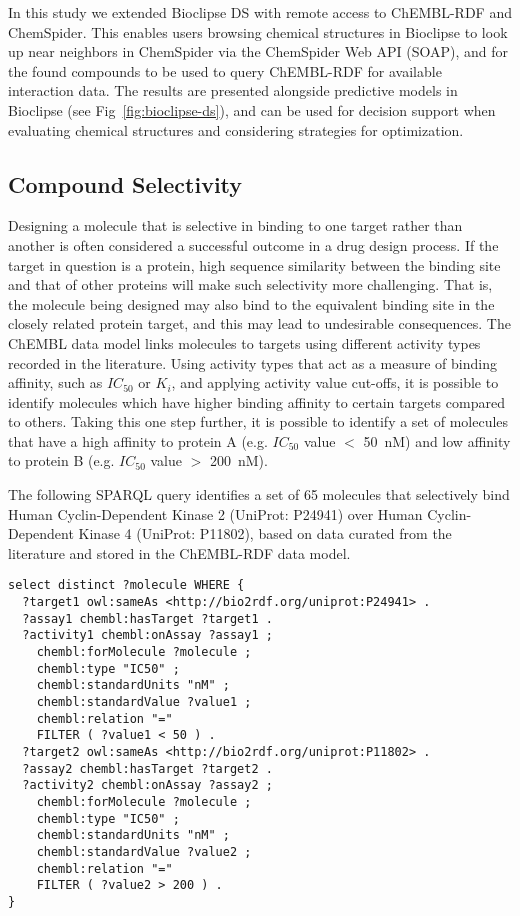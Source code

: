 \documentclass[10pt]{bmc_article}
\newenvironment{bmcformat}{\begin{raggedright}\baselineskip20pt\sloppy\setboolean{publ}{false}}{\end{raggedright}\baselineskip20pt\sloppy}
\begin{document}
\begin{bmcformat}
In this study we extended Bioclipse DS with remote access to ChEMBL-RDF and ChemSpider. 
This enables users browsing chemical structures in Bioclipse to look up near neighbors in ChemSpider 
via the ChemSpider Web API (SOAP), and for the found compounds to be used to query ChEMBL-RDF for 
available interaction data. The results are presented alongside predictive models in Bioclipse
(see Fig~\ref{fig:bioclipse-ds}), and can be used for decision support when evaluating chemical
structures and considering strategies for optimization.

\subsection*{Compound Selectivity}

Designing a molecule that is selective in binding to one target rather than another is often considered a 
successful outcome in a drug design process. If the target in question is a protein, high sequence similarity
between the binding site and that of other proteins will make such selectivity more challenging. 
That is, the molecule being 
designed may also bind to the equivalent binding site in the closely related protein 
target, and this may lead to undesirable consequences. The ChEMBL data model links molecules to 
targets using different activity types recorded in the literature. Using activity types 
that act as a measure of binding affinity, such as $IC_{50}$ or $K_{i}$, and applying activity value 
cut-offs, it is possible to identify molecules which have higher binding affinity to certain targets 
compared to others. Taking this one step further, it is possible to identify a set of molecules
that have a high affinity to protein A (e.g. $IC_{50}$ value $<$ 50~nM) and low affinity to protein 
B (e.g. $IC_{50}$ value $>$ 200~nM). 

The following SPARQL query identifies a set of 65 molecules that selectively bind Human Cyclin-Dependent Kinase 2 
(UniProt: P24941) over Human Cyclin-Dependent Kinase 4 (UniProt: P11802), based on data curated from the 
literature and stored in the ChEMBL-RDF data model. 

\begin{small}
\begin{verbatim}
select distinct ?molecule WHERE {
  ?target1 owl:sameAs <http://bio2rdf.org/uniprot:P24941> .
  ?assay1 chembl:hasTarget ?target1 .
  ?activity1 chembl:onAssay ?assay1 ;
    chembl:forMolecule ?molecule ;
    chembl:type "IC50" ;
    chembl:standardUnits "nM" ;
    chembl:standardValue ?value1 ;
    chembl:relation "="
    FILTER ( ?value1 < 50 ) .
  ?target2 owl:sameAs <http://bio2rdf.org/uniprot:P11802> .
  ?assay2 chembl:hasTarget ?target2 .
  ?activity2 chembl:onAssay ?assay2 ;
    chembl:forMolecule ?molecule ;
    chembl:type "IC50" ;
    chembl:standardUnits "nM" ;
    chembl:standardValue ?value2 ;
    chembl:relation "="
    FILTER ( ?value2 > 200 ) .
}
\end{verbatim}
\end{small}


\end{bmcformat}
\end{document}
